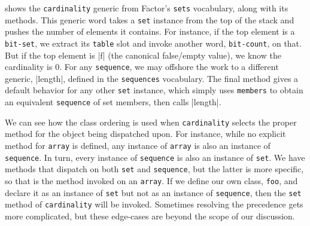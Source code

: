 
 shows the \Verb|cardinality| generic from Factor's
\Verb|sets| vocabulary, along with its methods.  This generic word takes a
\Verb|set| instance from the top of the stack and pushes the number of elements
it contains.  For instance, if the top element is a \Verb|bit-set|, we extract
its \Verb|table| slot and invoke another word, \Verb|bit-count|, on that.  But
if the top element is \factor|f| (the canonical false/empty value), we know the
cardinality is $0$.  For any \Verb|sequence|, we may offshore the work to a
different generic, \factor|length|, defined in the \Verb|sequences| vocabulary.
The final method gives a default behavior for any other \Verb|set| instance,
which simply uses \Verb|members| to obtain an equivalent \Verb|sequence| of set
members, then calls \factor|length|.


We can see how the class ordering is used when \Verb|cardinality| selects the
proper method for the object being dispatched upon.  For instance, while no
explicit method for \Verb|array| is defined, any instance of \Verb|array| is
also an instance of \Verb|sequence|.  In turn, every instance of
\Verb|sequence| is also an instance of \Verb|set|.  We have methods that
dispatch on both \Verb|set| and \Verb|sequence|, but the latter is more
specific, so that is the method invoked on an \Verb|array|.  If we define our
own class, \Verb|foo|, and declare it as an instance of \Verb|set| but not as
an instance of \Verb|sequence|, then the \Verb|set| method of
\Verb|cardinality| will be invoked.  Sometimes resolving the precedence gets
more complicated, but these edge-cases are beyond the scope of our discussion.

